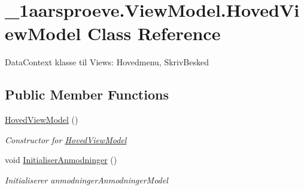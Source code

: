 \hypertarget{class__1aarsproeve_1_1_view_model_1_1_hoved_view_model}{}\section{\+\_\+1aarsproeve.\+View\+Model.\+Hoved\+View\+Model Class Reference}
\label{class__1aarsproeve_1_1_view_model_1_1_hoved_view_model}


Data\+Context klasse til Views\+: Hovedmenu, Skriv\+Besked  


\subsection*{Public Member Functions}
\begin{DoxyCompactItemize}
\item 
\hyperlink{class__1aarsproeve_1_1_view_model_1_1_hoved_view_model_ad1f93a3cec1e8f3b2272a4e92adb2815}{Hoved\+View\+Model} ()
\begin{DoxyCompactList}\small\item\em Constructor for \hyperlink{class__1aarsproeve_1_1_view_model_1_1_hoved_view_model}{Hoved\+View\+Model} \end{DoxyCompactList}\item 
void \hyperlink{class__1aarsproeve_1_1_view_model_1_1_hoved_view_model_a68003d432c3635ed670f816338720c9a}{Initialiser\+Anmodninger} ()
\begin{DoxyCompactList}\small\item\em Initialiserer anmodninger\+Anmodninger\+Model \end{DoxyCompactList}\end{DoxyCompactItemize}
